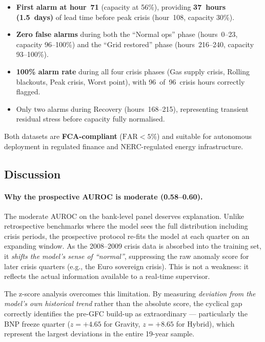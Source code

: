 \begin{itemize}
\item \textbf{First alarm at hour~71} (capacity at 56\%), providing
  \textbf{37~hours (1.5~days)} of lead time before peak crisis
  (hour~108, capacity 30\%).
\item \textbf{Zero false alarms} during both the ``Normal ops''
  phase (hours~0--23, capacity 96--100\%) and the ``Grid restored''
  phase (hours~216--240, capacity 93--100\%).
\item \textbf{100\% alarm rate} during all four crisis phases (Gas
  supply crisis, Rolling blackouts, Peak crisis, Worst point), with
  96~of~96~crisis hours correctly flagged.
\item Only two alarms during Recovery (hours~168--215), representing
  transient residual stress before capacity fully normalised.
\end{itemize}

Both datasets are \textbf{FCA-compliant} ($\text{FAR} < 5\%$) and
suitable for autonomous deployment in regulated finance and
NERC-regulated energy infrastructure.

\subsection{Discussion}
\label{sec:discussion_realworld}

\paragraph{Why the prospective AUROC is moderate (0.58--0.60).}
The moderate AUROC on the bank-level panel deserves explanation.
Unlike retrospective benchmarks where the model sees the full
distribution including crisis periods, the prospective protocol
re-fits the model at each quarter on an expanding window.  As the
2008--2009 crisis data is absorbed into the training set, it
\emph{shifts the model's sense of ``normal''}, suppressing the raw
anomaly score for later crisis quarters (e.g., the Euro sovereign
crisis).  This is not a weakness: it reflects the actual information
available to a real-time supervisor.

The z-score analysis overcomes this limitation.  By measuring
\emph{deviation from the model's own historical trend} rather than
the absolute score, the cyclical gap correctly identifies the
pre-GFC build-up as extraordinary --- particularly the BNP freeze
quarter ($z{=}+4.65$ for Gravity, $z{=}+8.65$ for Hybrid), which
represent the largest deviations in the entire 19-year sample.

